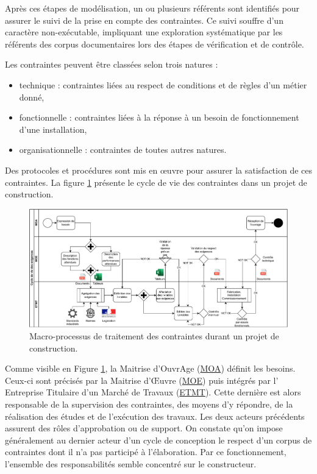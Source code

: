 \documentclass[a4paper,12pt]{article}
\begin{document}
Après ces étapes de modélisation, un ou plusieurs référents sont identifiés pour assurer le suivi de la prise en compte des contraintes. Ce suivi souffre d'un caractère non-exécutable, impliquant une exploration systématique par les référents  des corpus documentaires lors des étapes de vérification et de contrôle.

Les contraintes peuvent être classées selon trois natures :
\begin{itemize}
\item technique : contraintes liées au respect de conditions et de règles d'un métier donné,
\item fonctionnelle : contraintes liées à la réponse à un besoin de fonctionnement d'une installation,
\item organisationnelle : contraintes de toutes autres natures.
\end{itemize}

Des protocoles et procédures sont mis en œuvre pour assurer la satisfaction de ces contraintes. La figure \ref{fig:org89de545} présente le cycle de vie des contraintes dans un projet de construction.


\begin{figure}[htbp]
\centering
\includegraphics[width=.9\linewidth]{./svg/BPMN-LifeCycle-Exigences-init.pdf}
\caption{\label{fig:org89de545}Macro-processus de traitement des contraintes durant un projet de construction.}
\end{figure}

Comme visible en Figure \ref{fig:org89de545}, la Maitrise d’OuvrAge
 (\protect\hyperlink{gls-9}{\label{gls-9-use-1}MOA}) définit les besoins. Ceux-ci sont précisés par la Maitrise d'Œuvre
 (\protect\hyperlink{gls-10}{\label{gls-10-use-1}MOE}) puis intégrés par l' Entreprise Titulaire d'un Marché de Travaux
 (\protect\hyperlink{gls-11}{\label{gls-11-use-1}ETMT}). Cette dernière est alors responsable de la supervision des contraintes, des moyens d’y répondre, de la réalisation des études et de l'exécution des travaux. Les deux acteurs précédents assurent des rôles d'approbation ou de support. On constate qu’on impose généralement au dernier acteur d’un cycle de conception le respect d’un corpus de contraintes dont il n’a pas participé à l’élaboration. Par ce fonctionnement, l’ensemble des responsabilités semble concentré sur le constructeur.
\end{document}
